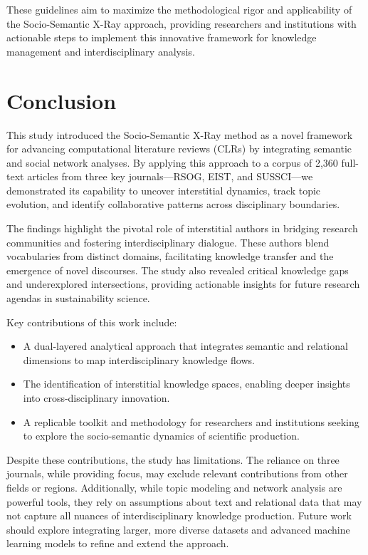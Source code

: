 \documentclass[12pt]{article}
\begin{document}
These guidelines aim to maximize the methodological rigor and applicability of the Socio-Semantic X-Ray approach, providing researchers and institutions with actionable steps to implement this innovative framework for knowledge management and interdisciplinary analysis.

\section{Conclusion}
\label{sec:conclusion}

This study introduced the Socio-Semantic X-Ray method as a novel framework for advancing computational literature reviews (CLRs) by integrating semantic and social network analyses. By applying this approach to a corpus of 2,360 full-text articles from three key journals—RSOG, EIST, and SUSSCI—we demonstrated its capability to uncover interstitial dynamics, track topic evolution, and identify collaborative patterns across disciplinary boundaries.

The findings highlight the pivotal role of interstitial authors in bridging research communities and fostering interdisciplinary dialogue. These authors blend vocabularies from distinct domains, facilitating knowledge transfer and the emergence of novel discourses. The study also revealed critical knowledge gaps and underexplored intersections, providing actionable insights for future research agendas in sustainability science.

Key contributions of this work include:
\begin{itemize}
    \item A dual-layered analytical approach that integrates semantic and relational dimensions to map interdisciplinary knowledge flows.
    \item The identification of interstitial knowledge spaces, enabling deeper insights into cross-disciplinary innovation.
    \item A replicable toolkit and methodology for researchers and institutions seeking to explore the socio-semantic dynamics of scientific production.
\end{itemize}

Despite these contributions, the study has limitations. The reliance on three journals, while providing focus, may exclude relevant contributions from other fields or regions. Additionally, while topic modeling and network analysis are powerful tools, they rely on assumptions about text and relational data that may not capture all nuances of interdisciplinary knowledge production. Future work should explore integrating larger, more diverse datasets and advanced machine learning models to refine and extend the approach.
\end{document}
